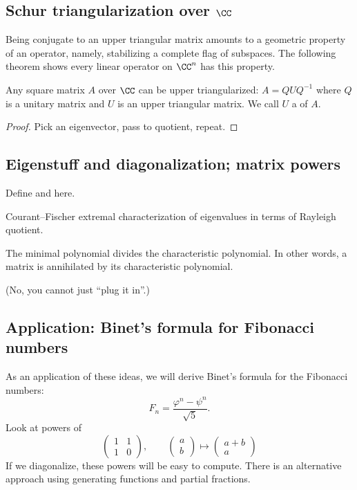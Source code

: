 \subsection{Schur triangularization over $\CC$}

Being conjugate to an upper triangular matrix amounts to a geometric property of an operator, namely, stabilizing a complete flag of subspaces. The following theorem shows every linear operator on $\CC^n$ has this property.

\begin{theorem}
Any square matrix $A$ over $\CC$ can be upper triangularized: $A = QUQ^{-1}$ where $Q$ is a unitary matrix and $U$ is an upper triangular matrix. We call $U$ a  of $A$.
\end{theorem}

\begin{proof}
Pick an eigenvector, pass to quotient, repeat.
\end{proof}

\subsection{Eigenstuff and diagonalization; matrix powers}

\begin{definition}
Define  and  here.
\end{definition}


Courant--Fischer extremal characterization of eigenvalues in terms of Rayleigh quotient. %

\begin{theorem}
The minimal polynomial divides the characteristic polynomial. In other words, a matrix is annihilated by its characteristic polynomial.
\end{theorem}

(No, you cannot just ``plug it in''.)

\subsection{Application: Binet's formula for Fibonacci numbers}

As an application of these ideas, we will derive Binet's formula for the Fibonacci numbers:
\[ F_n = \frac{\varphi^n - \psi^n}{\sqrt 5}. \]
Look at powers of
\[ \begin{pmatrix} 1 & 1 \\ 1 & 0 \end{pmatrix}, \qquad \begin{pmatrix} a \\ b \end{pmatrix} \mapsto \begin{pmatrix} a+b \\ a \end{pmatrix} \]
If we diagonalize, these powers will be easy to compute. There is an alternative approach using generating functions and partial fractions.